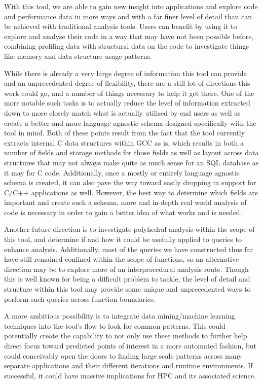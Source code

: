 With this tool, we are able to gain new insight into applications and explore code and performance data in more ways and with a far finer level of detail than can be achieved with traditional analysis tools.
Users can benefit by using it to explore and analyse their code in a way that may have not been possible before, combining profiling data with structural data on the code to investigate things like memory and data structure usage patterns.

While there is already a very large degree of information this tool can provide and an unprecedented degree of flexibility, there are a still lot of directions this work could go, and a number of things necessary to help it get there.
One of the more notable such tasks is to actually reduce the level of information extracted down to more closely match what is actually utilised by end users as well as create a better and more language agnostic schema designed specifically with the tool in mind.
Both of these points result from the fact that the tool currently extracts internal C data structures within \acs{GCC} as is, which results in both a number of fields and storage methods for those fields as well as layout across data structures that may not always make quite as much sense for an \acs{SQL} database as it may for C code.
Additionally, once a mostly or entirely language agnostic schema is created, it can also pave the way toward easily dropping in support for C/C++ applications as well.
However, the best way to determine which fields are important and create such a schema, more and in-depth real world analysis of code is necessary in order to gain a better idea of what works and is needed.

Another future direction is to investigate polyhedral analysis within the scope of this tool, and determine if and how it could be usefully applied to queries to enhance analysis.
Additionally, most of the queries we have constructed thus far have still remained confined within the scope of functions, so an alternative direction may be to explore more of an interprocedural analysis route.
Though this is well known for being a difficult problem to tackle, the level of detail and structure within this tool may provide some unique and unprecedented ways to perform such queries across function boundaries.

A more ambitious possibility is to integrate data mining/machine learning techniques into the tool's flow to look for common patterns.
This could potentially create the capability to not only use these methods to further help direct focus toward predicted points of interest in a more automated fashion, but could conceivably open the doors to finding large scale patterns across many separate applications and their different iterations and runtime environments.
If successful, it could have massive implications for \acl{HPC} and its associated science.
